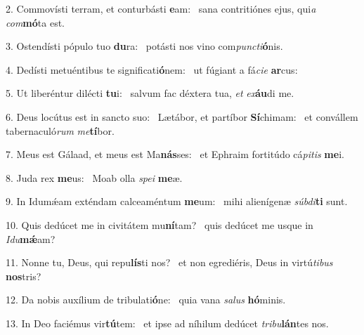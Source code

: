 2. Commovísti terram, et conturbásti \textbf{e}am: \ast\  sana contritiónes ejus, qui\textit{a} \textit{com}\textbf{mó}ta est.\

3. Ostendísti pópulo tuo \textbf{du}ra: \ast\  potásti nos vino com\textit{punc}\textit{ti}\textbf{ó}nis.\

4. Dedísti metuéntibus te significati\textbf{ó}nem: \ast\  ut fúgiant a fá\textit{ci}\textit{e} \textbf{ar}cus:\

5. Ut liberéntur dilécti \textbf{tu}i: \ast\  salvum fac déxtera tua, \textit{et} \textit{ex}\textbf{áu}di me.\

6. Deus locútus est in sancto suo: \dag\  Lætábor, et partíbor \textbf{Sí}chimam: \ast\  et convállem tabernaculó\textit{rum} \textit{me}\textbf{tí}bor.\

7. Meus est Gálaad, et meus est Ma\textbf{nás}ses: \ast\  et Ephraim fortitúdo cá\textit{pi}\textit{tis} \textbf{me}i.\

8. Juda rex \textbf{me}us: \ast\  Moab olla \textit{spe}\textit{i} \textbf{me}æ.\

9. In Idumǽam exténdam calceaméntum \textbf{me}um: \ast\  mihi alienígenæ \textit{súb}\textit{di}\textbf{ti} sunt.\

10. Quis dedúcet me in civitátem mu\textbf{ní}tam? \ast\  quis dedúcet me usque in \textit{I}\textit{du}\textbf{mǽ}am?\

11. Nonne tu, Deus, qui repu\textbf{lís}ti nos? \ast\  et non egrediéris, Deus in virtú\textit{ti}\textit{bus} \textbf{nos}tris?\

12. Da nobis auxílium de tribulati\textbf{ó}ne: \ast\  quia vana \textit{sa}\textit{lus} \textbf{hó}minis.\

13. In Deo faciémus vir\textbf{tú}tem: \ast\  et ipse ad níhilum dedúcet \textit{tri}\textit{bu}\textbf{lán}tes nos.\

